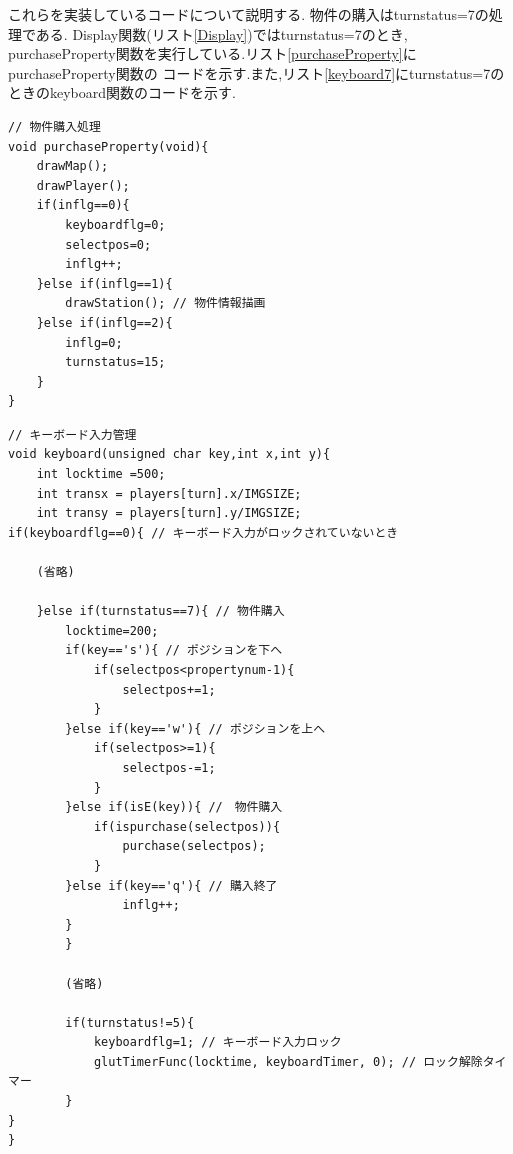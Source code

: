 \documentclass[a4j]{jarticle}
\begin{document}
    これらを実装しているコードについて説明する. 物件の購入はturnstatus=7の処理である.
    Display関数(リスト\ref{Display})ではturnstatus=7のとき, purchaseProperty関数を実行している.リスト\ref{purchaseProperty}にpurchaseProperty関数の
    コードを示す.また,リスト\ref{keyboard7}にturnstatus=7のときのkeyboard関数のコードを示す.\\

    \begin{lstlisting}[basicstyle=\ttfamily\footnotesize, frame=single,label=purchaseProperty,caption=purchaseProperty関数]
// 物件購入処理
void purchaseProperty(void){
    drawMap();
    drawPlayer(); 
    if(inflg==0){
        keyboardflg=0;
        selectpos=0;
        inflg++;
    }else if(inflg==1){
        drawStation(); // 物件情報描画
    }else if(inflg==2){
        inflg=0;
        turnstatus=15;
    }
}
    \end{lstlisting} 

    \begin{lstlisting}[basicstyle=\ttfamily\footnotesize, frame=single,label=keyboard7,caption=物件購入時のキーボード入力の処理]
// キーボード入力管理
void keyboard(unsigned char key,int x,int y){
    int locktime =500;
    int transx = players[turn].x/IMGSIZE;
    int transy = players[turn].y/IMGSIZE;
if(keyboardflg==0){ // キーボード入力がロックされていないとき
    
    (省略)

    }else if(turnstatus==7){ // 物件購入
        locktime=200;
        if(key=='s'){ // ポジションを下へ
            if(selectpos<propertynum-1){
                selectpos+=1;
            }            
        }else if(key=='w'){ // ポジションを上へ
            if(selectpos>=1){
                selectpos-=1;
            }            
        }else if(isE(key)){ //　物件購入
            if(ispurchase(selectpos)){
                purchase(selectpos);
            }
        }else if(key=='q'){ // 購入終了
                inflg++;
        }
        }

        (省略)

        if(turnstatus!=5){
            keyboardflg=1; // キーボード入力ロック
            glutTimerFunc(locktime, keyboardTimer, 0); // ロック解除タイマー
        }
}
}
    \end{lstlisting} 
\end{document}

